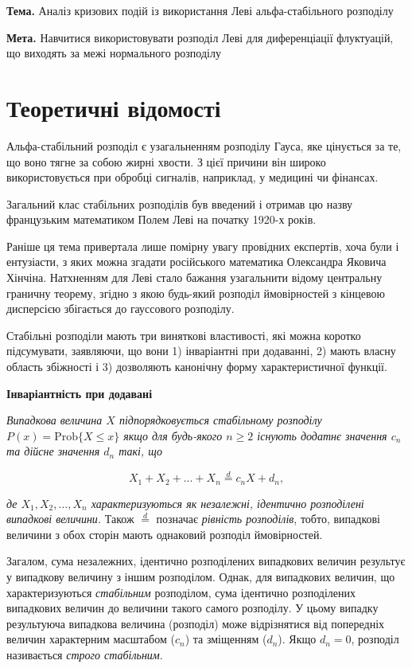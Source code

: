 \documentclass[
  letterpaper,
]{report}
\begin{document}
\textbf{Тема.} Аналіз кризових подій із використання Леві
альфа-стабільного розподілу

\textbf{Мета.} Навчитися використовувати розподіл Леві для диференціації
флуктуацій, що виходять за межі нормального розподілу

\hypertarget{ux442ux435ux43eux440ux435ux442ux438ux447ux43dux456-ux432ux456ux434ux43eux43cux43eux441ux442ux456-6}{%
\section{Теоретичні
відомості}\label{ux442ux435ux43eux440ux435ux442ux438ux447ux43dux456-ux432ux456ux434ux43eux43cux43eux441ux442ux456-6}}

Альфа-стабільний розподіл є узагальненням розподілу Гауса, яке цінується
за те, що воно тягне за собою жирні хвости. З цієї причини він широко
використовується при обробці сигналів, наприклад, у медицині чи
фінансах.

Загальний клас стабільних розподілів був введений і отримав цю назву
французьким математиком Полем Леві на початку 1920-х років.

Раніше ця тема привертала лише помірну увагу провідних експертів, хоча
були і ентузіасти, з яких можна згадати російського математика
Олександра Яковича Хінчіна. Натхненням для Леві стало бажання
узагальнити відому центральну граничну теорему, згідно з якою будь-який
розподіл ймовірностей з кінцевою дисперсією збігається до гауссового
розподілу.

Стабільні розподіли мають три виняткові властивості, які можна коротко
підсумувати, заявляючи, що вони 1) інваріантні при додаванні, 2) мають
власну область збіжності і 3) дозволяють канонічну форму
характеристичної функції.

\textbf{Інваріантність при додавані}

\emph{Випадкова величина \(X\) підпорядковується стабільному розподілу
\(P(x) = \text{Prob}\{X \leq x\}\) якщо для будь-якого \(n \geq 2\)
існують додатнє значення \(c_{n}\) та дійсне значення \(d_{n}\) такі,
що}

\[ 
X_1 + X_2 + ... + X_n \stackrel{d}{=} c_{n}X + d_{n}, 
\]

\emph{де \(X_1, X_2, ..., X_n\) характеризуються як незалежні, ідентично
розподілені випадкові величини.} Також \(\stackrel{d}{=}\) позначає
\emph{рівність розподілів}, тобто, випадкові величини з обох сторін
мають однаковий розподіл ймовірностей.

Загалом, сума незалежних, ідентично розподілених випадкових величин
результує у випадкову величину з іншим розподілом. Однак, для випадкових
величин, що характеризуються \emph{стабільним} розподілом, сума
ідентично розподілених випадкових величин до величини такого самого
розподілу. У цьому випадку результуюча випадкова величина (розподіл)
може відрізнятися від попередніх величин характерним масштабом
(\(c_{n}\)) та зміщенням (\(d_{n}\)). Якщо \(d_{n} = 0\), розподіл
називається \emph{строго стабільним}.
\end{document}
